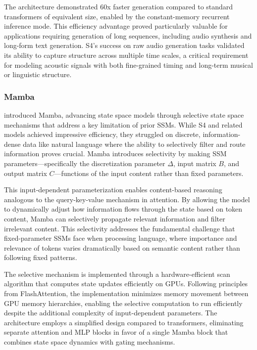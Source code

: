 The architecture demonstrated 60x faster generation compared to standard transformers of equivalent size, enabled by the constant-memory recurrent inference mode. This efficiency advantage proved particularly valuable for applications requiring generation of long sequences, including audio synthesis and long-form text generation. S4's success on raw audio generation tasks validated its ability to capture structure across multiple time scales, a critical requirement for modeling acoustic signals with both fine-grained timing and long-term musical or linguistic structure.

\subsubsection{Mamba}

\citet{gu2023mamba} introduced Mamba, advancing state space models through selective state space mechanisms that address a key limitation of prior SSMs. While S4 and related models achieved impressive efficiency, they struggled on discrete, information-dense data like natural language where the ability to selectively filter and route information proves crucial. Mamba introduces selectivity by making SSM parameters—specifically the discretization parameter $\Delta$, input matrix $B$, and output matrix $C$—functions of the input content rather than fixed parameters.

This input-dependent parameterization enables content-based reasoning analogous to the query-key-value mechanism in attention. By allowing the model to dynamically adjust how information flows through the state based on token content, Mamba can selectively propagate relevant information and filter irrelevant content. This selectivity addresses the fundamental challenge that fixed-parameter SSMs face when processing language, where importance and relevance of tokens varies dramatically based on semantic content rather than following fixed patterns.

The selective mechanism is implemented through a hardware-efficient scan algorithm that computes state updates efficiently on GPUs. Following principles from FlashAttention, the implementation minimizes memory movement between GPU memory hierarchies, enabling the selective computation to run efficiently despite the additional complexity of input-dependent parameters. The architecture employs a simplified design compared to transformers, eliminating separate attention and MLP blocks in favor of a single Mamba block that combines state space dynamics with gating mechanisms.

